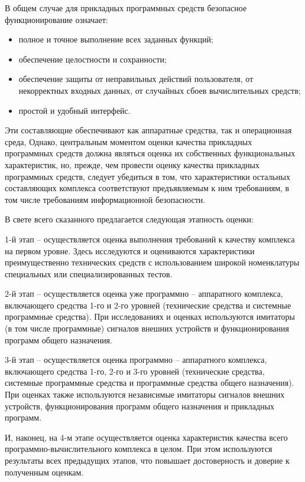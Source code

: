 В общем случае для прикладных программных средств безопасное функционирование означает:

\begin{itemize}
\item полное и точное выполнение всех заданных функций;
\item обеспечение целостности и сохранности;
\item обеспечение защиты от неправильных действий пользователя, от некорректных входных данных, от случайных сбоев вычислительных средств;
\item простой и удобный интерфейс.
\end{itemize}

Эти составляющие обеспечивают как аппаратные средства, так и операционная среда, Однако, центральным моментом оценки качества прикладных программных средств должна являться оценка их собственных функциональных характеристик, но, прежде, чем провести оценку качества прикладных программных средств, следует убедиться в том, что характеристики остальных составляющих комплекса соответствуют предъявляемым к ним требованиям, в том числе требованиям информационной безопасности.

В свете всего сказанного предлагается следующая этапность оценки:

1-й этап – осуществляется оценка выполнения требований к качеству комплекса на первом уровне. Здесь исследуются и оцениваются характеристики преимущественно технических средств с использованием широкой номенклатуры специальных или специализированных тестов.

2-й этап – осуществляется оценка уже программно – аппаратного комплекса, включающего средства 1-го и 2-го уровней (технические средства и системные программные средства). При исследованиях и оценках используются имитаторы (в том числе программные) сигналов внешних устройств и функционирования программ общего назначения.

3-й этап – осуществляется оценка программно – аппаратного комплекса, включающего средства 1-го, 2-го и 3-го уровней (технические средства, системные программные средства и программные средства общего назначения). При оценках также используются независимые имитаторы сигналов внешних устройств, функционирования программ общего назначения и прикладных программ.

И, наконец, на 4-м этапе осуществляется оценка характеристик качества всего программно-вычислительного комплекса в целом. При этом используются результаты всех предыдущих этапов, что повышает достоверность и доверие к полученным оценкам.

